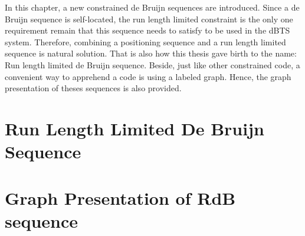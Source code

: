 In this chapter, a new constrained de Bruijn sequences are introduced. Since a de Bruijn sequence is self-located, the run length limited constraint is the only one requirement remain that this sequence needs to satisfy to be used in the \gls{dBTS} system. Therefore, combining a positioning sequence and a run length limited sequence is natural solution. That is also how this thesis gave birth to the name: Run length limited de Bruijn sequence. Beside, just like other constrained code, a convenient way to apprehend a code is using a labeled graph. Hence, the graph presentation of theses sequences is also provided. 

\section{Run Length Limited De Bruijn Sequence}



\section{Graph Presentation of RdB sequence}








